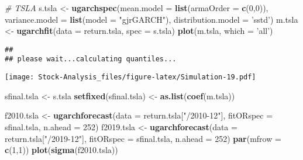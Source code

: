 \documentclass[
]{article}
\newenvironment{Shaded}{\begin{snugshade}}{\end{snugshade}}
\newcommand{\CommentTok}[1]{\textcolor[rgb]{0.56,0.35,0.01}{\textit{#1}}}
\newcommand{\DataTypeTok}[1]{\textcolor[rgb]{0.13,0.29,0.53}{#1}}
\newcommand{\DecValTok}[1]{\textcolor[rgb]{0.00,0.00,0.81}{#1}}
\newcommand{\KeywordTok}[1]{\textcolor[rgb]{0.13,0.29,0.53}{\textbf{#1}}}
\newcommand{\NormalTok}[1]{#1}
\newcommand{\StringTok}[1]{\textcolor[rgb]{0.31,0.60,0.02}{#1}}
\begin{document}
\begin{Shaded}
\begin{Highlighting}[]
\CommentTok{# TSLA}
\NormalTok{s.tsla <-}\StringTok{ }\KeywordTok{ugarchspec}\NormalTok{(}\DataTypeTok{mean.model =} \KeywordTok{list}\NormalTok{(}\DataTypeTok{armaOrder =} \KeywordTok{c}\NormalTok{(}\DecValTok{0}\NormalTok{,}\DecValTok{0}\NormalTok{)),}
                \DataTypeTok{variance.model =} \KeywordTok{list}\NormalTok{(}\DataTypeTok{model =} \StringTok{"gjrGARCH"}\NormalTok{),}
                \DataTypeTok{distribution.model =} \StringTok{'sstd'}\NormalTok{)}
\NormalTok{m.tsla <-}\StringTok{ }\KeywordTok{ugarchfit}\NormalTok{(}\DataTypeTok{data =}\NormalTok{ return.tsla, }\DataTypeTok{spec =}\NormalTok{ s.tsla)}
\KeywordTok{plot}\NormalTok{(m.tsla, }\DataTypeTok{which =} \StringTok{'all'}\NormalTok{)}
\end{Highlighting}
\end{Shaded}

\begin{verbatim}
## 
## please wait...calculating quantiles...
\end{verbatim}

\texttt{[image: Stock-Analysis\_files/figure-latex/Simulation-19.pdf]}

\begin{Shaded}
\begin{Highlighting}[]
\NormalTok{sfinal.tsla <-}\StringTok{ }\NormalTok{s.tsla}
\KeywordTok{setfixed}\NormalTok{(sfinal.tsla) <-}\StringTok{ }\KeywordTok{as.list}\NormalTok{(}\KeywordTok{coef}\NormalTok{(m.tsla))}

\NormalTok{f2010.tsla <-}\StringTok{ }\KeywordTok{ugarchforecast}\NormalTok{(}\DataTypeTok{data =}\NormalTok{ return.tsla[}\StringTok{"/2010-12"}\NormalTok{],}
                        \DataTypeTok{fitORspec =}\NormalTok{ sfinal.tsla,}
                        \DataTypeTok{n.ahead =} \DecValTok{252}\NormalTok{)}
\NormalTok{f2019.tsla <-}\StringTok{ }\KeywordTok{ugarchforecast}\NormalTok{(}\DataTypeTok{data =}\NormalTok{ return.tsla[}\StringTok{"/2019-12"}\NormalTok{],}
                        \DataTypeTok{fitORspec =}\NormalTok{ sfinal.tsla,}
                        \DataTypeTok{n.ahead =} \DecValTok{252}\NormalTok{)}
\KeywordTok{par}\NormalTok{(}\DataTypeTok{mfrow =} \KeywordTok{c}\NormalTok{(}\DecValTok{1}\NormalTok{,}\DecValTok{1}\NormalTok{))}
\KeywordTok{plot}\NormalTok{(}\KeywordTok{sigma}\NormalTok{(f2010.tsla))}
\end{Highlighting}
\end{Shaded}
\end{document}
